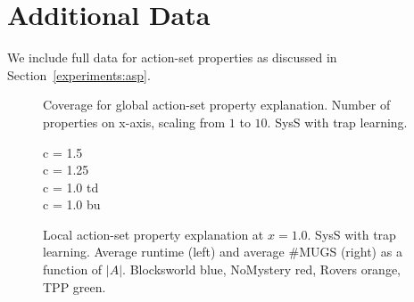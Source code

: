 \section{Additional Data}
\label{apendix:data}

We include full data for action-set properties as discussed in
Section~\ref{experiments:asp}.

\begin{figure}[htb]
\vspace{-0.0cm}
\small
\centering




\vspace{-0.0cm}
\caption{\label{fig:appendix:asp-global} Coverage for global
  action-set property explanation. Number of properties on x-axis,
  scaling from $1$ to $10$. SysS with trap learning.}
\vspace{-0.0cm}
\end{figure}


\begin{figure}[htb]
\vspace{-0.0cm}
\small
\centering

c = 1.5\\

c = 1.25\\

c = 1.0 td\\

c = 1.0 bu\\

\vspace{-0.0cm}
\caption{\label{fig:appendix:asp-local} Local action-set property
  explanation at $x=1.0$. SysS with trap learning. Average runtime
  (left) and average \#MUGS (right) as a function of
  $|A|$. Blocksworld blue, NoMystery red, Rovers orange, TPP
  green.}
\vspace{-0.0cm}
\end{figure}

